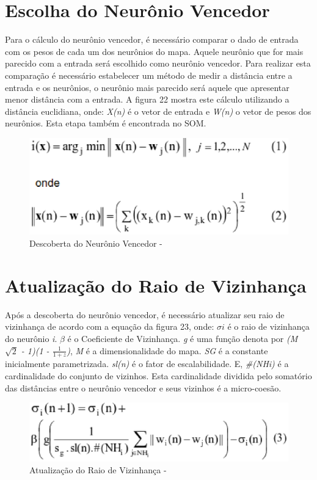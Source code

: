 \section{Escolha do Neurônio Vencedor}
Para o cálculo do neurônio vencedor, é necessário comparar o dado de entrada com os pesos de cada um dos neurônios do mapa. Aquele neurônio que for mais parecido com a entrada será escolhido como neurônio vencedor. Para realizar esta comparação é necessário estabelecer um método de medir a distância entre a entrada e os neurônios, o neurônio mais parecido será aquele que apresentar menor distância com a entrada. A figura 22 mostra este cálculo utilizando a distância euclidiana, onde: \textit{X(n)} é o vetor de entrada e \textit{W(n)} o vetor de pesos dos neurônios. Esta etapa também é encontrada no SOM.

\begin{figure}[!h]
\centering
\includegraphics[keepaspectratio=true,scale=0.50]
{figuras/vencedor.eps}
\caption{Descoberta do Neurônio Vencedor - }
\label{data_titatic}
\end{figure}

\section{Atualização do Raio de Vizinhança}
Após a descoberta do neurônio vencedor, é necessário atualizar seu raio de vizinhança de acordo com a equação da figura 23, onde: $\sigma i$ é o raio de vizinhança do neurônio \textit{i}. $\beta$ é o Coeficiente de Vizinhança. \textit{g} é uma função denota por \textit{(M $\sqrt{2}$ - 1)(1 - $\frac{1}{1 + z}$)}, \textit{M} é a dimensionalidade do mapa. \textit{SG} é a constante inicialmente parametrizada. \textit{sl(n)} é o fator de escalabilidade. E, \textit{\#(NHi)} é a cardinalidade do conjunto de vizinhos. Esta cardinalidade dividida pelo somatório das distâncias entre o neurônio vencedor e seus vizinhos é a micro-coesão. 

\begin{figure}[!h]
\centering
\includegraphics[keepaspectratio=true,scale=0.50]
{figuras/viz.eps}
\caption{Atualização do Raio de Vizinhança - }
\label{data_titatic}
\end{figure}

